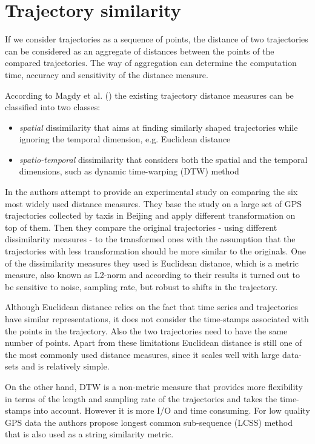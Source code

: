 \section{Trajectory similarity}
If we consider trajectories as a sequence of points, the distance of two trajectories can be considered as an aggregate of distances between the points of the compared trajectories. The way of aggregation can determine the computation time, accuracy and sensitivity of the distance measure.

According to Magdy et al. (\cite{traj-sim-rev}) the existing trajectory distance measures can be classified into two classes: 
\begin{itemize}
    \item \textit{spatial} dissimilarity that aims at finding similarly  shaped trajectories while ignoring the temporal dimension, e.g. Euclidean distance
    \item \textit{spatio-temporal} dissimilarity that considers both the spatial and the temporal dimensions, such as dynamic time-warping (DTW) method
\end{itemize}

In \cite{traj-sim} the authors attempt to provide an experimental study on comparing the six most widely used distance measures. They base the study on a large set of GPS trajectories collected by taxis in Beijing and apply different transformation on top of them. Then they compare the original trajectories - using different dissimilarity measures - to the transformed ones with the assumption that the trajectories with less transformation should be more similar to the originals. One of the dissimilarity measures they used is Euclidean distance, which is a metric measure, also known as L2-norm and according to their results it turned out to be sensitive to noise, sampling rate, but robust to shifts in the trajectory.

Although Euclidean distance relies on the fact that time series and trajectories have similar representations, it does not consider the time-stamps associated with the points in the trajectory. Also the two trajectories need to have the same number of points. Apart from these limitations Euclidean distance is still one of the most commonly used distance measures, since it scales well with large data-sets and is relatively simple. 

On the other hand, DTW is a non-metric measure that provides more flexibility in terms of the length and sampling rate of the trajectories and takes the time-stamps into account. However it is more I/O and time consuming. For low quality GPS data the authors propose longest common sub-sequence (LCSS) method that is also used as a string similarity metric.

